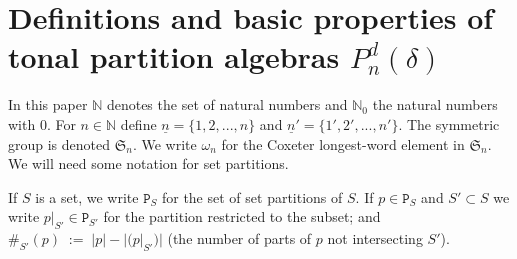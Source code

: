 \documentclass[reqno,10pt,a4paper]{amsart}
\newcommand{\N}{\mathbb{N}}
\newcommand{\nk}{n}  %
\newcommand{\dl}{d}  %
\newcommand{\PP}{P_\nk^\dl(\delta)} %
\newcommand{\Sym}{\mathfrak{S}}
\newcommand{\rmP}{{\mathtt P}} %
\newcommand{\rmPe}{{\rmP}^{(e)}} %
\begin{document}




\section{Definitions 
and basic properties
of 
tonal partition 
algebras $\PP$}    \label{ss:defns}






\newcommand{\Potts}{{\mathfrak{P}}}
\newcommand{\Pcat}{{\mathsf{P}}}
\newcommand{\Mat}{{\mathsf{Mat}}}
\newcommand{\mat}{\left( \begin{array}{ccccccccccccccccccccc}}
\newcommand{\tam}{\end{array} \right)}

\newcommand{\ul}[1]{\underline{#1}} 

\newcommand{\Fk}{\mathbbm{k}}   %


\newcommand{\pro}{\mathcal{P}}


\newcommand{\DDD}{{\mathcal{D}}}  %




\noindent 
In this paper 
$\N$ denotes the set of  natural numbers and $\N_0$ the natural numbers with 0. 
For $n \in \N$ define $\underline{n} = \{1,2,...,n\}$ and 
$\underline{n}' = \{1',2',...,n'\}$.
The symmetric group is denoted $\Sym_n$. 
We write $\omega_n$ for the Coxeter longest-word element in $\Sym_n$. 
We will need some notation for set partitions. 



\newcommand{\bb}[1]{b^{#1}}  %
\newcommand{\bbb}[1]{b_0^{#1}}  %
\newcommand{\w}[1]{w^{#1}}


If $S$ is a set, we write $\rmP_S$ for the set of set partitions of $S$. 
If $p \in \rmP_S$ and $S' \subset S$ we write $p|_{S'} \in \rmP_{S'}$ for the 
partition restricted to the subset; 
and $\#_{S'}(p) \; := \; |p| - |(p|_{S'})|$ 
(the number of parts of $p$ not intersecting $S'$). 
\end{document}
